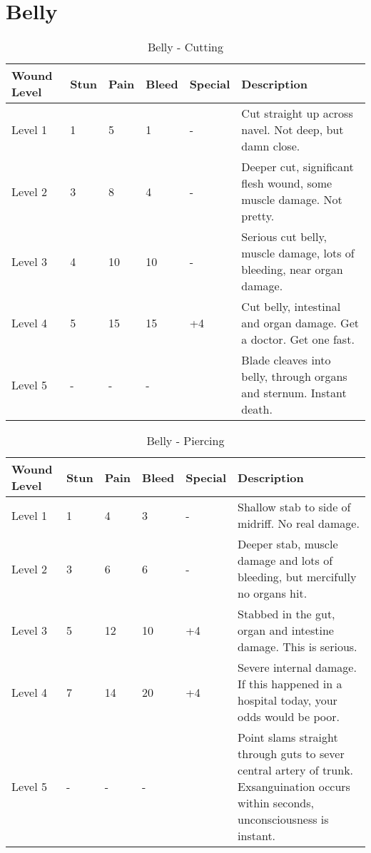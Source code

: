 \documentclass[oneside,11pt,english]{book}
\begin{document}
\section{Belly} \vspace{-25pt} \label{sec:belly}
\begin{table}[hb] %
	\caption{Belly - Cutting}
	\label{wound:Belly - Cutting}
	\begin{tabu} to 
Wound Level &Stun &Pain &Bleed &Special &Description\\\toprule
Level 1& 1& 5& 1& - &Cut straight up across navel. Not deep, but damn close.\\
Level 2& 3& 8& 4& - &Deeper cut, significant flesh wound, some muscle damage. Not pretty.\\
Level 3& 4& 10& 10& - &Serious cut belly, muscle damage, lots of bleeding, near organ damage.\\
Level 4& 5& 15& 15&  +4 &Cut belly, intestinal and organ damage. Get a doctor. Get one fast.\\
Level 5& - &- &- && Blade cleaves into belly, through organs and sternum. Instant death.\\
	\end{tabu}
\end{table}

\begin{table}[hb] %
	\caption{Belly - Piercing}
	\label{wound:Belly - Piercing}
	\begin{tabu} to 
Wound Level &Stun &Pain &Bleed &Special &Description\\\toprule
Level 1& 1& 4& 3& - &Shallow stab to side of midriff. No real damage.\\
Level 2& 3& 6& 6& - &Deeper stab, muscle damage and lots of bleeding, but mercifully no organs hit.\\
Level 3& 5& 12& 10&  +4 &Stabbed in the gut, organ and intestine damage. This is serious.\\
Level 4& 7& 14& 20&  +4 &Severe internal damage. If this happened in a hospital today, your odds would be poor.\\
Level 5& - &- &- && Point slams straight through guts to sever central artery of trunk. Exsanguination occurs within seconds, unconsciousness is instant.\\
	\end{tabu}
\end{table}
\end{document}
